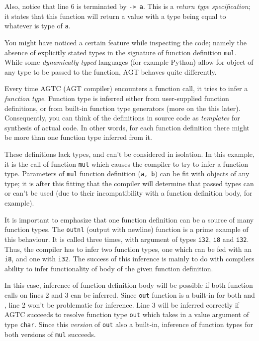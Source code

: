 \documentclass[times, utf8, diplomski]{fer}
\theoremstyle{definition}
\begin{document}
Also, notice that line 6 is terminated by \texttt{-> a}. This is a \textit{return type specification};
it states that this function will return a value with a type being equal to whatever is type of \texttt{a}. 

You might have noticed a certain feature while inspecting the code; 
namely the absence of explicitly stated types in the signature of function definition \texttt{mul}.
While some \textit{dynamically typed} languages (for example Python) allow for object of any type to be passed
to the function, AGT behaves quite differently. 

Every time AGTC (AGT compiler) encounters a function call,
it tries to infer a \textit{function type}. Function type is inferred either from user-supplied function 
definitions, or from built-in function type generators (more on the this later).
Consequently, you can think of the definitions in source code as \textit{templates} for synthesis
of actual code. In other words, for each function definition there might be more than one
function type inferred from it.

These definitions lack types, and can't be considered in isolation.
In this example, it is the call of function \texttt{mul} which causes
the compiler to try to infer a function type.
Parameters of \texttt{mul} function definition (\texttt{a, b}) can be fit with objects of
any type; it is after this fitting that the compiler will determine that passed types can or can't
be used (due to their incompatibility with a function definition body, for example).

It is important to emphasize that one function definition can be a source of many function types.
The \texttt{outnl} (output with newline) function is a prime example of this behaviour.
It is called three times, with argument of types \texttt{i32}, \texttt{i8} and \texttt{i32}.
Thus, the compiler has to infer two function types, 
one which can be fed with an \texttt{i8}, and one with \texttt{i32}.
The success of this inference is mainly to do with compilers ability to infer functionality of 
body of the given function definition.

In this case, inference of function definition body will be possible if both function calls on lines
2 and 3 can be inferred. Since \texttt{out} function is a built-in for both  and ,
line 2 won't be problematic for inference. Line 3 will be inferred correctly if AGTC succeeds to resolve
function type \texttt{out} which takes in a value argument of type \texttt{char}. 
Since this \textit{version} of \texttt{out} also a built-in,
inference of function types for both versions of \texttt{mul} succeeds.
\end{document}
